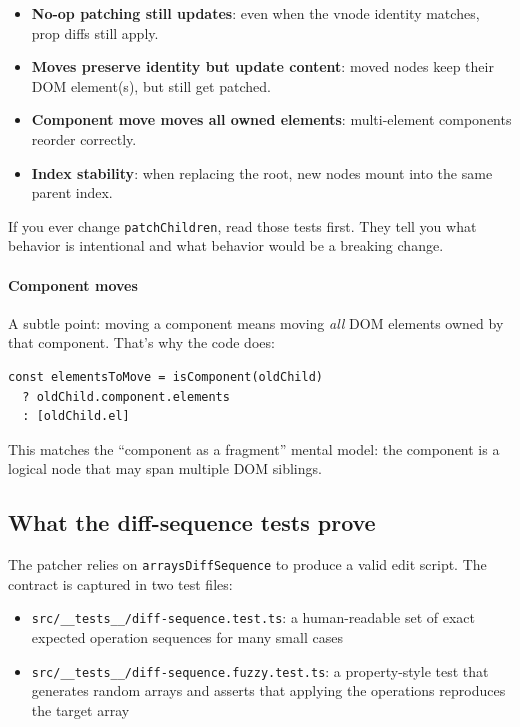 \begin{itemize}
  \item \textbf{No-op patching still updates}: even when the vnode identity matches, prop diffs still apply.
  \item \textbf{Moves preserve identity but update content}: moved nodes keep their DOM element(s), but still get patched.
  \item \textbf{Component move moves all owned elements}: multi-element components reorder correctly.
  \item \textbf{Index stability}: when replacing the root, new nodes mount into the same parent index.
\end{itemize}

If you ever change \texttt{patchChildren}, read those tests first. They tell you what behavior is intentional and what behavior would be a breaking change.

\paragraph{Component moves}

A subtle point: moving a component means moving \emph{all} DOM elements owned by that component.
That’s why the code does:

\begin{verbatim}
const elementsToMove = isComponent(oldChild)
  ? oldChild.component.elements
  : [oldChild.el]
\end{verbatim}

This matches the ``component as a fragment'' mental model: the component is a logical node that may span multiple DOM siblings.

\subsection{What the diff-sequence tests prove}
The patcher relies on \texttt{arraysDiffSequence} to produce a valid edit script. The contract is captured in two test files:

\begin{itemize}
  \item \texttt{src/\_\_tests\_\_/diff-sequence.test.ts}: a human-readable set of exact expected operation sequences for many small cases
  \item \texttt{src/\_\_tests\_\_/diff-sequence.fuzzy.test.ts}: a property-style test that generates random arrays and asserts that applying the operations reproduces the target array
\end{itemize}

